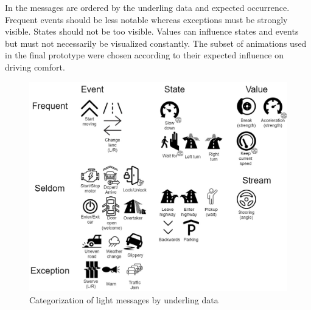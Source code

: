  In  the messages are ordered by the underling data and expected occurrence. Frequent events should be less notable whereas exceptions must be strongly visible. States should not be too visible. Values can influence states and events but must not necessarily be visualized constantly. The subset of animations used in the final prototype were chosen according to their expected influence on driving comfort. 
\begin{figure}
    \includegraphics[height=0.6\textwidth]{fig/tab-}
    \caption[Light Events]{Categorization of light messages by underling data}
    \label{fig:lightevents}
\end{figure}

